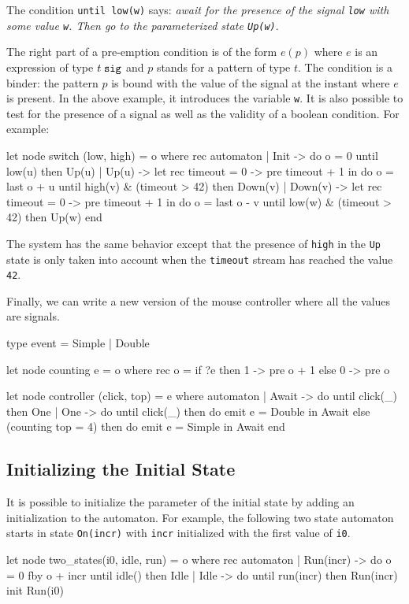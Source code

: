 \documentclass[11pt,titlepage,twoside]{report}
\begin{document}
The condition \verb-until low(w)- says: {\em await for the presence of
  the signal \verb-low- with some value \verb-w-. Then go to the
  parameterized state \verb-Up(w)-}.

\newcommand{\Signal}[1]{{#1}\;\mbox{\tt sig}}

The right part of a pre-emption condition is of the form $e(p)$ where
$e$ is an expression of type $\Signal{t}$ and $p$ stands for a pattern
of type $t$. The condition is a binder: the pattern $p$ is bound with
the value of the signal at the instant where $e$ is present.  In the
above example, it introduces the variable \verb-w-. It is also
possible to test for the presence of a signal as well as the validity
of a boolean condition. For example:
\begin{chklisting}[withresult]
let node switch (low, high) = o where
  rec automaton
  | Init -> do o = 0 until low(u) then Up(u)
  | Up(u) ->
      let rec timeout = 0 -> pre timeout + 1 in
      do o = last o + u
      until high(v) & (timeout > 42) then Down(v)
  | Down(v) ->
      let rec timeout = 0 -> pre timeout + 1 in
      do o = last o - v
      until low(w) & (timeout > 42) then Up(w)
  end
\end{chklisting}
The system has the same behavior except that the presence of
\verb-high- in the \verb-Up- state is only taken into account when the
\verb-timeout- stream has reached the value \verb-42-.

Finally, we can write a new version of the mouse controller where all
the values are signals.
\begin{chklisting}[withresult]
type event = Simple | Double

let node counting e = o where
  rec o = if ?e then 1 -> pre o + 1 else 0 -> pre o

let node controller (click, top) = e where
  automaton
  | Await ->
     do until click(_) then One
  | One ->
     do until click(_) then do emit e = Double in Await
     else (counting top = 4) then do emit e = Simple in Await
  end
\end{chklisting}

\subsection{Initializing the Initial State\label{initinitstate}} %

It is possible to initialize the parameter of the initial state by adding
an initialization to the automaton. For example, the following two state 
automaton
starts in state \texttt{On(incr)} with \texttt{incr} initialized with the first
value of \texttt{i0}.
\begin{chklisting}[withresult]
let node two_states(i0, idle, run) = o where
  rec automaton
      | Run(incr) -> do o = 0 fby o + incr until idle() then Idle
      | Idle -> do until run(incr) then Run(incr)
      init Run(i0)
\end{chklisting}
\end{document}
